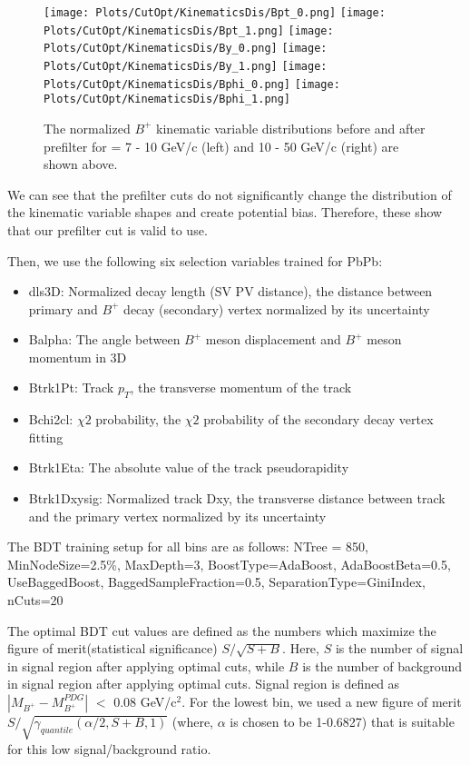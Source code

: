 \clearpage

\begin{figure}[h]
\begin{center}
\texttt{[image: Plots/CutOpt/KinematicsDis/Bpt\_0.png]}
\texttt{[image: Plots/CutOpt/KinematicsDis/Bpt\_1.png]}
\texttt{[image: Plots/CutOpt/KinematicsDis/By\_0.png]}
\texttt{[image: Plots/CutOpt/KinematicsDis/By\_1.png]}
\texttt{[image: Plots/CutOpt/KinematicsDis/Bphi\_0.png]}
\texttt{[image: Plots/CutOpt/KinematicsDis/Bphi\_1.png]}
\caption{The normalized  $B^+$ kinematic variable distributions before and after prefilter for \pt = 7 - 10 GeV/c (left) and 10 - 50 GeV/c (right) are shown above.}
\label{fig:KinematicsDisBP}
\end{center}
\end{figure}
\clearpage

We can see that the prefilter cuts do not significantly change the distribution of the kinematic variable shapes and create potential bias. Therefore, these show that our prefilter cut is valid to use. 

Then, we use the following six selection variables trained for PbPb:
\begin{itemize}
\item dls3D: Normalized decay length (SV PV distance), the distance between primary and $B^{+}$ decay (secondary) vertex normalized by its uncertainty
\item Balpha: The angle between $B^{+}$ meson displacement and $B^{+}$ meson momentum in 3D
\item Btrk1Pt: Track $p_{T}$, the transverse momentum of the track
\item Bchi2cl: $\chi2$ probability, the $\chi2$ probability of the secondary decay vertex fitting
\item Btrk1Eta: The absolute value of the track pseudorapidity
\item Btrk1Dxysig: Normalized track Dxy, the transverse distance between track and the primary vertex normalized by its uncertainty
\end{itemize}

The BDT training setup for all \pt bins are as follows: NTree = 850, MinNodeSize=2.5\%, MaxDepth=3, BoostType=AdaBoost, AdaBoostBeta=0.5, UseBaggedBoost, BaggedSampleFraction=0.5, SeparationType=GiniIndex, nCuts=20

The optimal BDT cut values are defined as the numbers which maximize the figure of merit(statistical significance) $S/\sqrt{S+B}$. Here, $S$ is the number of signal in signal region after applying optimal cuts, while $B$ is the number of background in signal region after applying optimal cuts. Signal region is defined as $|M_{B^{+}}-M_{B^{+}}^{PDG}|$ $<$ 0.08 GeV/c$^2$. For the lowest \pt bin, we used a new figure of merit $S/\sqrt{\gamma_{quantile}(\alpha/2,S+B,1)}$ (where, $\alpha$ is chosen to be 1-0.6827) that is suitable for this low signal/background ratio. 

